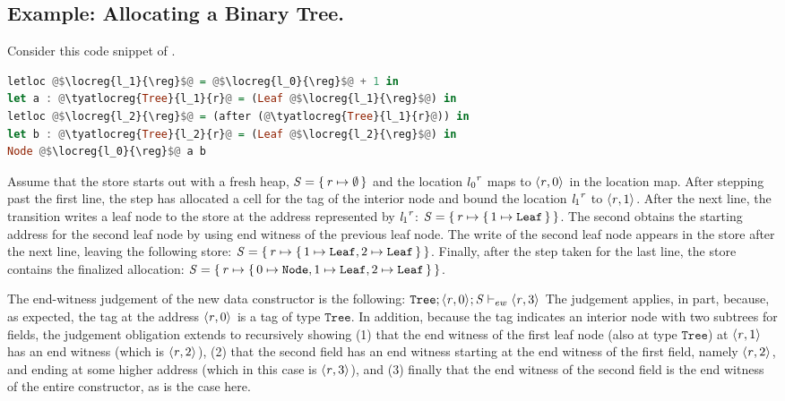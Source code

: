 \documentclass[showabstract,showacknowledgments,showpreface,showdedication]{iuphd}
\begin{document}
\subsection{Example: Allocating a Binary Tree.}
\label{sec:dynsem-example}
%
Consider this code snippet of \ourcalc{}.
%
\begin{lstlisting}[language=Haskell]
letloc @$\locreg{l_1}{\reg}$@ = @$\locreg{l_0}{\reg}$@ + 1 in
let a : @\tyatlocreg{Tree}{l_1}{r}@ = (Leaf @$\locreg{l_1}{\reg}$@) in
letloc @$\locreg{l_2}{\reg}$@ = (after (@\tyatlocreg{Tree}{l_1}{r}@)) in
let b : @\tyatlocreg{Tree}{l_2}{r}@ = (Leaf @$\locreg{l_2}{\reg}$@) in
Node @$\locreg{l_0}{\reg}$@ a b
\end{lstlisting}
%
Assume that the store starts out with a fresh heap, $\mathit{S} = \{ \, \mathit{r}
  \mapsto \emptyset \,\}$ and the location ${l_0}^{\mathit{r}}$ maps to
$\langle \mathit{r}, 0 \rangle ^{}$ in the location map.
%
After stepping past the first line, the \textsc{\dletloctag{}} step has
allocated a cell for the tag of the interior node and bound the
location ${\mathit{l}_1}^{\mathit{r}}$ to $\langle \mathit{r}, 1 \rangle ^{}$.
%
After the next line, the \textsc{\ddatacon{}} transition writes a leaf node to
the store at the address represented by ${\mathit{l}_1}^{\mathit{r}}$:
$\mathit{S} = \{ \, \mathit{r} \mapsto \{ \, 1 \mapsto \mathtt{Leaf} \,\} \,\}$.
%
The second  obtains the starting address for the second
leaf node by using end witness of the previous leaf node.
%
The write of the second leaf node appears in the store after
the next line, leaving the following store:
$
\mathit{S} = \{ \, \mathit{r} \mapsto \{ \, 1 \mapsto \mathtt{Leaf}, 2 \mapsto \mathtt{Leaf} \,\} \,\}$.
%
Finally, after the \textsc{\ddatacon{}} step taken for the last line, the store
contains the finalized allocation:
$\mathit{S} = \{ \, \mathit{r} \mapsto \{ \, 0 \mapsto \mathtt{Node}, 1 \mapsto \mathtt{Leaf}, 2 \mapsto \mathtt{Leaf} \,\} \,\}$.
%

The end-witness judgement of the new data constructor is the
following:
$\mathtt{Tree};\langle \mathit{r}, 0 \rangle ^{};\mathit{S} \vdash_{ew} \langle \mathit{r}, 3 \rangle ^{}$
%
The judgement applies, in part, because, as expected, the tag at the
address $\langle \mathit{r}, 0 \rangle ^{}$ is a tag of type $\mathtt{Tree}$.
%
In addition, because the tag indicates an interior node with two
subtrees for fields, the judgement obligation extends to recursively
showing (1) that the end witness of the first leaf node (also at type
$\mathtt{Tree}$) at $\langle \mathit{r}, 1 \rangle ^{}$ has an end witness
(which is $\langle \mathit{r}, 2 \rangle ^{}$), (2) that the second field has an
end witness starting at the end witness of the first field, namely
$\langle \mathit{r}, 2 \rangle ^{}$, and ending at some higher address (which in
this case is $\langle \mathit{r}, 3 \rangle ^{}$), and (3) finally that the end
witness of the second field is the end witness of the entire
constructor, as is the case here.
\end{document}
